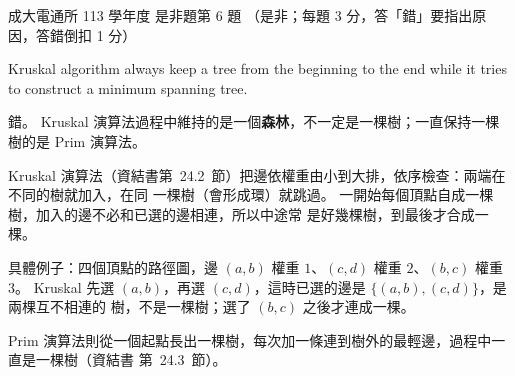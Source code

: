 \begin{pastexam}[label={px:ncku-113-cce-06}]{成大電通所 113 學年度 是非題第 6 題}
（是非；每題 3 分，答「錯」要指出原因，答錯倒扣 1 分）

Kruskal algorithm always keep a tree from the beginning to the end while it tries to construct a
minimum spanning tree.
\end{pastexam}

\begin{pastsoln}
錯。 Kruskal 演算法過程中維持的是一個\textbf{森林}，不一定是一棵樹；一直保持一棵樹的是 Prim
演算法。

Kruskal 演算法（資結書第~24.2~節）把邊依權重由小到大排，依序檢查：兩端在不同的樹就加入，在同
一棵樹（會形成環）就跳過。 一開始每個頂點自成一棵樹，加入的邊不必和已選的邊相連，所以中途常
是好幾棵樹，到最後才合成一棵。

具體例子：四個頂點的路徑圖，邊 $(a, b)$ 權重 $1$、$(c, d)$ 權重 $2$、$(b, c)$ 權重 $3$。
Kruskal 先選 $(a, b)$，再選 $(c, d)$，這時已選的邊是 $\{(a, b), (c, d)\}$，是兩棵互不相連的
樹，不是一棵樹；選了 $(b, c)$ 之後才連成一棵。

Prim 演算法則從一個起點長出一棵樹，每次加一條連到樹外的最輕邊，過程中一直是一棵樹（資結書
第~24.3~節）。
\end{pastsoln}
